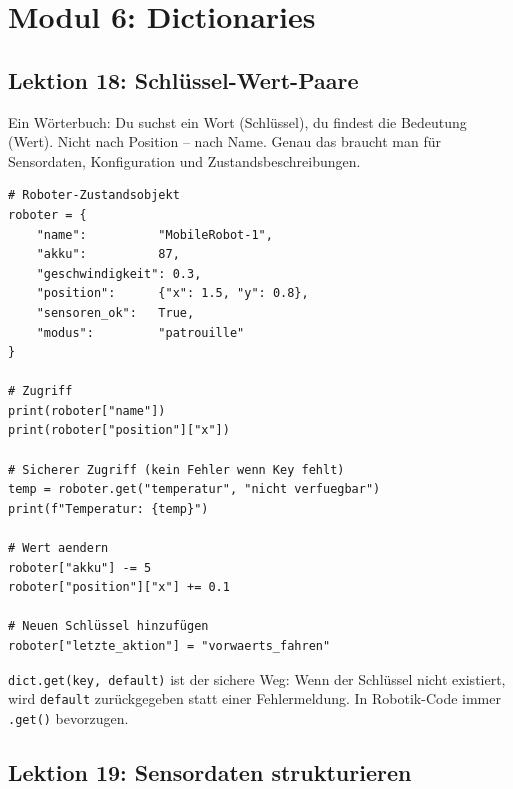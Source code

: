 \chapter{Modul 6: Dictionaries}

\section{Lektion 18: Schlüssel-Wert-Paare}

\begin{analogie}
Ein Wörterbuch: Du suchst ein Wort (Schlüssel), du findest die Bedeutung (Wert). Nicht nach Position -- nach Name. Genau das braucht man für Sensordaten, Konfiguration und Zustandsbeschreibungen.
\end{analogie}

\begin{lstlisting}
# Roboter-Zustandsobjekt
roboter = {
    "name":          "MobileRobot-1",
    "akku":          87,
    "geschwindigkeit": 0.3,
    "position":      {"x": 1.5, "y": 0.8},
    "sensoren_ok":   True,
    "modus":         "patrouille"
}

# Zugriff
print(roboter["name"])
print(roboter["position"]["x"])

# Sicherer Zugriff (kein Fehler wenn Key fehlt)
temp = roboter.get("temperatur", "nicht verfuegbar")
print(f"Temperatur: {temp}")

# Wert aendern
roboter["akku"] -= 5
roboter["position"]["x"] += 0.1

# Neuen Schlüssel hinzufügen
roboter["letzte_aktion"] = "vorwaerts_fahren"
\end{lstlisting}

\begin{merksatz}
\texttt{dict.get(key, default)} ist der sichere Weg: Wenn der Schlüssel nicht existiert, wird \texttt{default} zurückgegeben statt einer Fehlermeldung. In Robotik-Code immer \texttt{.get()} bevorzugen.
\end{merksatz}

\section{Lektion 19: Sensordaten strukturieren}

